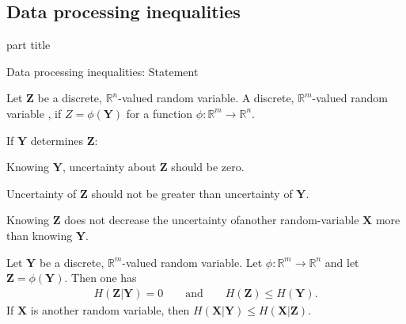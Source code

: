 \subsection{Data processing inequalities}
\begin{frame}
 \vspace{12.0ex}
\begin{center}
\begin{beamercolorbox}[sep=12pt,center]{part title}
\insertsubsection\par
\end{beamercolorbox}
\end{center}
\end{frame}
\begin{frame}{Data processing inequalities: Statement}
\begin{definition}
Let $\mathbf{Z}$ be a discrete, $\mathbb{R}^n$-valued random variable. A discrete, $\mathbb{R}^m$-valued random variable , if $Z=\phi(\mathbf{Y})$ for 
a function $\phi:\mathbb{R}^m\to\mathbb{R}^n$.
\end{definition}
\vspace{-2.5mm}

 If $\mathbf{Y}$ determines $\mathbf{Z}$:
\bit%
\item Knowing $\mathbf{Y}$, uncertainty about $\mathbf{Z}$ should be zero.
\item Uncertainty of $\mathbf{Z}$ should not be greater than uncertainty of $\mathbf{Y}$.
\item Knowing $\mathbf{Z}$ does not decrease the uncertainty ofanother random-variable $\mathbf{X}$ more than knowing $\mathbf{Y}$.    
\eit 
{}
\begin{proposition}
Let $\mathbf{Y}$ be a discrete, $\mathbb{R}^m$-valued random variable. Let 
$\phi:\mathbb{R}^m\to\mathbb{R}^n$ and let $\mathbf{Z}=\phi(\mathbf{Y})$. 
Then one has 
\begin{align*}
H(\mathbf{Z}|\mathbf{Y})=0 \qquad\text{and} \qquad H(\mathbf{Z})\leq H(\mathbf{Y}).  
\end{align*}
If $\mathbf{X}$ is another random variable, then 
$H(\mathbf{X}|\mathbf{Y})\leq H(\mathbf{X}|\mathbf{Z})$. 
\end{proposition}
\end{frame}

